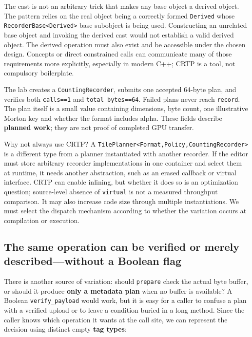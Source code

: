 The cast is not an arbitrary trick that makes any base object a derived object. The pattern relies on the real object being a correctly formed \texttt{Derived} whose \texttt{RecorderBase\textless{}Derived\textgreater{}} base subobject is being used. Constructing an unrelated base object and invoking the derived cast would not establish a valid derived object. The derived operation must also exist and be accessible under the chosen design. Concepts or direct constrained calls can communicate many of those requirements more explicitly, especially in modern C++; CRTP is a tool, not compulsory boilerplate.

The lab creates a \texttt{CountingRecorder}, submits one accepted 64-byte plan, and verifies both \texttt{calls==1} and \texttt{total\_bytes==64}. Failed plans never reach \texttt{record}. The plan itself is a small value containing dimensions, byte count, one illustrative Morton key and whether the format includes alpha. These fields describe \textbf{planned work}; they are not proof of completed GPU transfer.

Why not always use CRTP? A \texttt{TilePlanner\textless{}Format,Policy,CountingRecorder\textgreater{}} is a different type from a planner instantiated with another recorder. If the editor must store arbitrary recorder implementations in one container and select them at runtime, it needs another abstraction, such as an erased callback or virtual interface. CRTP can enable inlining, but whether it does so is an optimization question; source-level absence of \texttt{virtual} is not a measured throughput comparison. It may also increase code size through multiple instantiations. We must select the dispatch mechanism according to whether the variation occurs at compilation or execution.

\subsection{The same operation can be verified or merely described---without a Boolean flag}\label{05-engine-i-ch005-the-same-operation-can-be-verified-or-merely-describedwithout-a-boolean-flag}

There is another source of variation: should \texttt{prepare} check the actual byte buffer, or should it produce \textbf{only a metadata plan} when no buffer is available? A Boolean \texttt{verify\_payload} would work, but it is easy for a caller to confuse a plan with a verified upload or to leave a condition buried in a long method. Since the caller knows which operation it wants at the call site, we can represent the decision using distinct empty \textbf{tag types}:

